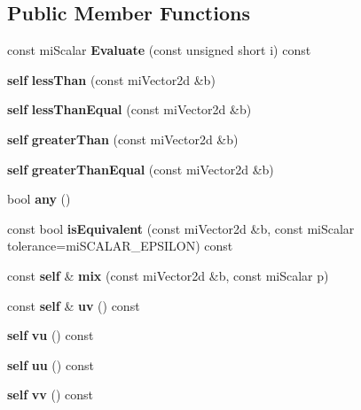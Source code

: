 \subsection*{Public Member Functions}
\begin{CompactItemize}
\item 
const mi\-Scalar {\bf Evaluate} (const unsigned short i) const 
\item 
{\bf self} {\bf less\-Than} (const mi\-Vector2d \&b)
\item 
{\bf self} {\bf less\-Than\-Equal} (const mi\-Vector2d \&b)
\item 
{\bf self} {\bf greater\-Than} (const mi\-Vector2d \&b)
\item 
{\bf self} {\bf greater\-Than\-Equal} (const mi\-Vector2d \&b)
\item 
bool {\bf any} ()
\item 
const bool {\bf is\-Equivalent} (const mi\-Vector2d \&b, const mi\-Scalar tolerance=mi\-SCALAR\_\-EPSILON) const 
\item 
const {\bf self} \& {\bf mix} (const mi\-Vector2d \&b, const mi\-Scalar p)
\item 
const {\bf self} \& {\bf uv} () const 
\item 
{\bf self} {\bf vu} () const 
\item 
{\bf self} {\bf uu} () const 
\item 
{\bf self} {\bf vv} () const 
\end{CompactItemize}
